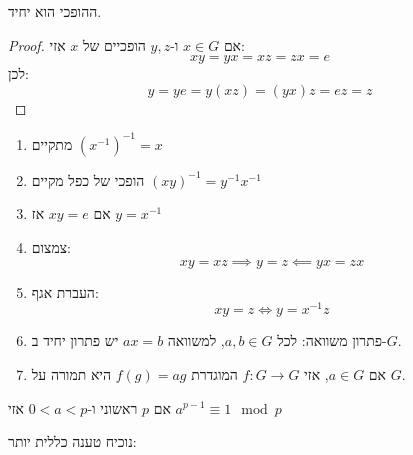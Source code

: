 \documentclass{tstextbook}
\begin{document}
\begin{proposition}
ההופכי הוא יחיד.

\end{proposition}
\begin{proof}
אם \(x \in G\) ו-\(y,z\) הופכיים של \(x\) אזי:
$$xy=yx=xz=zx=e$$
לכן:
$$y=ye=y(xz)=(yx)z=ez=z$$

\end{proof}
\begin{proposition}
  \begin{enumerate}
    \item מתקיים \((x^{-1})^{-1}=x\)


    \item הופכי של כפל מקיים \((xy)^{-1}=y^{-1}x ^{-1}\)


    \item אם \(xy=e\) אז \(y=x ^{-1}\)


    \item צמצום:\\
$$xy=xz\implies y=z \impliedby yx=zx$$


    \item העברת אגף:\\
$$xy=z\iff y=x ^{-1}z$$


    \item פתרון משוואה: לכל \(a,b\in G\), למשוואה \(ax=b\) יש פתרון יחיד ב-\(G\). 


    \item אם \(a\in G\), אזי \(f:G\to G\) המוגדרת \(f(g)=ag\) היא תמורה על \(G\). 


  \end{enumerate}
\end{proposition}
\begin{theorem}[פרמה]
אם \(p\) ראשוני ו-\(0<a <p\) אזי \(a^{p-1}\equiv 1\mod p\)

\end{theorem}
נוכיח טענה כללית יותר:
\end{document}
